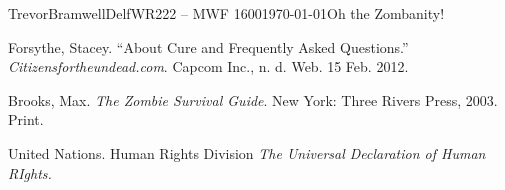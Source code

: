 \documentclass[12pt,letterpaper]{article}
\begin{document}
\begin{mla}{Trevor}{Bramwell}{Delf}{WR222 -- MWF 1600}{\today}{Oh the Zombanity!}
\begin{workscited}
\bibent
Forsythe, Stacey. ``About Cure and Frequently Asked Questions.'' \emph{Citizensfortheundead.com}. Capcom Inc., n. d. Web. 15 Feb. 2012.

\bibent
Brooks, Max. \emph{The Zombie Survival Guide}. New York: Three Rivers Press,
2003. Print.

\bibent
United Nations. Human Rights Division \emph{The Universal Declaration of Human RIghts.} 
\end{workscited}
\end{mla}
\end{document}
